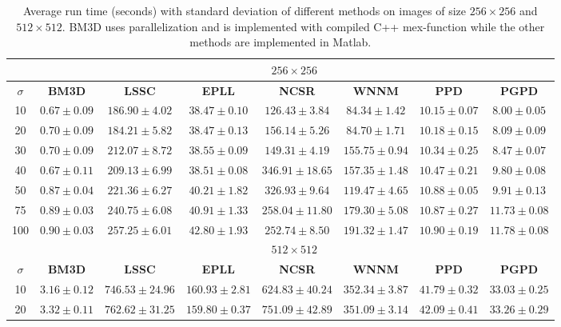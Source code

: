 \begin{table}
\caption{Average run time (seconds) with standard deviation of different methods on images of size $256\times 256$ and $512\times 512$. BM3D uses parallelization and is implemented with compiled C++ mex-function while the other methods are implemented in Matlab.}
\label{tab2}
\scriptsize
\begin{center}
\begin{tabular}{|c||c|c|c|c|c|c|c|}
\hline
&\multicolumn{7}{c|}{ $256 \times 256$}
\\
\hline
\hline
$\sigma$ &\textbf{BM3D}&\textbf{LSSC}&\textbf{EPLL}&\textbf{NCSR}&\textbf{WNNM}&\textbf{PPD}&\textbf{PGPD} 
\\
\hline
10  & $0.67\pm 0.09$  & $186.90\pm4.02$  & $38.47\pm0.10 $   & $126.43\pm3.84$   & $84.34\pm1.42$ &$10.15\pm0.07$ & $8.00\pm0.05$  
\\
\hline
20  &  $0.70\pm0.09$  & $184.21\pm5.82$   & $38.47\pm0.13$   &  $156.14\pm5.26$  &  $84.70\pm1.71$&$10.18\pm0.15$  &  $8.09\pm 0.09$             
\\
\hline 
30    &  $0.70 \pm 0.09$  &  $212.07\pm8.72$  & $38.55\pm0.09$  &  $149.31\pm4.19$  &  $155.75\pm0.94$ &$10.34\pm0.25$ &  $8.47\pm0.07$            
\\
\hline
40   &  $0.67\pm0.11$  &$209.13\pm6.99$ &  $38.51\pm0.08$  &  $346.91\pm18.65$  &  $157.35\pm1.48$&$10.47\pm0.21$  & $9.80\pm0.08$            
\\
\hline
50  &  $0.87\pm0.04$  &  $221.36\pm6.27$  &  $40.21\pm1.82 $  &  $326.93\pm9.64$  & $119.47\pm4.65$&$10.88\pm0.05$    &  $9.91\pm0.13$     
\\
\hline
75    & $0.89\pm0.03$ &  $240.75\pm6.08$  &   $40.91\pm1.33$ &  $258.04\pm11.80$  & $ 179.30\pm5.08$ &$10.87\pm0.27$  &   $11.73\pm0.08$  
\\
\hline
100  &  $0.90\pm0.03$  &  $257.25\pm6.01 $  &$42.80\pm 1.93$  & $252.74\pm8.50$   &  $191.32\pm 1.47$  &$10.90\pm0.19$ &  $11.78\pm0.08$     
\\
\hline
\hline
&\multicolumn{7}{c|}{ $512 \times 512$}
\\
\hline
\hline
$\sigma$ &\textbf{BM3D}&\textbf{LSSC}&\textbf{EPLL}&\textbf{NCSR}&\textbf{WNNM}&\textbf{PPD}&\textbf{PGPD} 
\\
\hline
10  &$3.16\pm0.12$ & $746.53\pm24.96$  &  $160.93\pm2.81$  & $624.83\pm40.24$   &  $352.34\pm3.87$&$41.79\pm0.32$  &  $33.03\pm0.25$   
\\
\hline
20 &$3.32\pm0.11$ & $762.62\pm31.25$  &  $159.80\pm0.37$  & $751.09\pm42.89$   &  $351.09\pm3.14$ &$42.09\pm0.41$ &  $33.26\pm0.29$   

\end{tabular}
\end{center}
\end{table}

